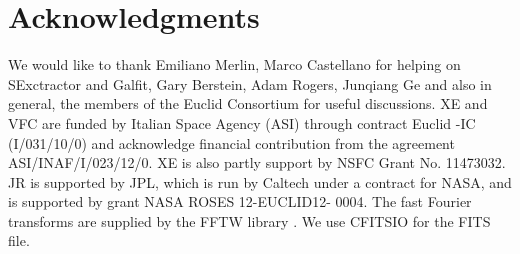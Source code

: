 \documentclass[useAMS,usenatbib]{mn2e}
\begin{document}
\section*{Acknowledgments}

We would like to thank Emiliano Merlin, Marco Castellano for helping
on SExctractor and Galfit, Gary Berstein, Adam Rogers, Junqiang Ge and
also in general, the members of the Euclid Consortium for useful
discussions.  XE and VFC are funded by Italian Space Agency (ASI)
through contract Euclid -IC (I/031/10/0) and acknowledge financial
contribution from the agreement ASI/INAF/I/023/12/0. XE is also partly
support by NSFC Grant No. 11473032. JR is supported by JPL, which is
run by Caltech under a contract for NASA, and is supported by grant
NASA ROSES 12-EUCLID12- 0004. The fast Fourier transforms are supplied
by the FFTW library \citep{fftw05}. We use CFITSIO
\citep{1999ASPC..172..487P} for the FITS file.

\appendix
\end{document}
